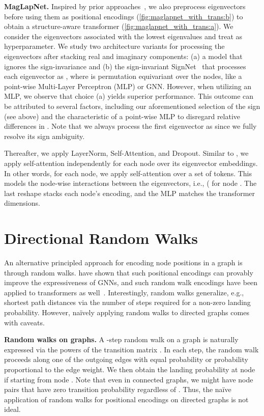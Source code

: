 \documentclass{article}
\begin{document}
\textbf{MagLapNet.} Inspired by prior approaches~\citep{lim_sign_2022, kreuzer_rethinking_2021}, we also preprocess eigenvectors before using them as positional encodings (\autoref{fig:maglapnet_with_trans:b}) to obtain a structure-aware transformer (\autoref{fig:maglapnet_with_trans:a}). We consider the eigenvectors associated with the  lowest eigenvalues  and treat  as hyperparameter. 
We study two architecture variants for processing the eigenvectors after stacking real and imaginary components: (a) a model that ignores the sign-invariance  and (b) the sign-invariant SignNet~\citep{lim_sign_2022} that processes each eigenvector as , where  is permutation equivariant over the nodes, like a point-wise Multi-Layer Perceptron (MLP) or GNN. 
However, when utilizing an MLP, we observe that choice (a) yields superior performance. This outcome can be attributed to several factors, including our aforementioned selection of the sign (see above) and the characteristic of a point-wise MLP to disregard relative differences in . Note that we always process the first eigenvector as  since we fully resolve its sign ambiguity.

Thereafter, we apply LayerNorm, Self-Attention, and Dropout. Similar to \citet{kreuzer_rethinking_2021}, we apply self-attention independently for each node  over its  eigenvector embeddings. In other words, for each node, we apply self-attention over a set of  tokens. This models the node-wise interactions between the eigenvectors, i.e., ( for node . The last reshape stacks each node's encoding, and the MLP  matches the transformer dimensions.

\section{Directional Random Walks}\label{sec:random_walks}

An alternative principled approach for encoding node positions in a graph is through random walks. \citet{li_distance_2020} have shown that such positional encodings can provably improve the expressiveness of GNNs, and such random walk encodings have been applied to transformers as well~\citep{mialon_graphit_2021}. Interestingly, random walks generalize, e.g., shortest path distances via the number of steps required for a non-zero landing probability. However, na\"ively applying random walks to directed graphs comes with caveats. 

\textbf{Random walks on graphs.} A -step random walk on a graph is naturally expressed via the powers  of the transition matrix . In each step, the random walk proceeds along one of the outgoing edges with equal probability or probability proportional to the edge weight. We then obtain the landing probability  at node  if starting from node . Note that even in connected graphs, we might have node pairs  that have zero transition probability regardless of . Thus, the na\"ive application of random walks for positional encodings on directed graphs is not ideal.
\end{document}
